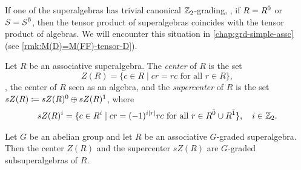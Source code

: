 If one of the superalgebras has trivial canonical $\mathbb{Z}_2$-grading, \ie, if $R = R^{\bar0}$ or $S = S^{\bar0}$, then the tensor product of superalgebras coincides with the tensor product of algebras. 
We will encounter this situation in \cref{chap:grd-simple-assc} (see \cref{rmk:M(D)=M(FF)-tensor-D}). 



\begin{defi}\label{defi:center}
	Let $R$ be an associative superalgebra.
	The \emph{center} of $R$ is the set
	\[
		Z(R) = \{c\in R \mid cr = rc \text{ for all } r\in R \},
	\]
	\ie, the center of $R$ seen as an algebra, and the \emph{supercenter} of $R$ is the set $sZ(R) \coloneqq sZ(R)^{\bar0} \oplus sZ(R)^{\bar1}$, where
	\begin{align*}
		sZ(R)^i = \{c\in R^i \mid cr = (-1)^{i |r|} rc \text{ for all } r\in R^{\bar0}\cup R^{\bar1} \},\quad i \in \mathbb{Z}_2.
	\end{align*}
\end{defi}





\begin{lemma}\label{lemma:center-is-graded}
	Let $G$ be an abelian group and let $R$ be an associative $G$-graded superalgebra.
	Then the center $Z(R)$ and the supercenter $sZ(R)$ are $G$-graded subsuperalgebras of $R$.
\end{lemma}

